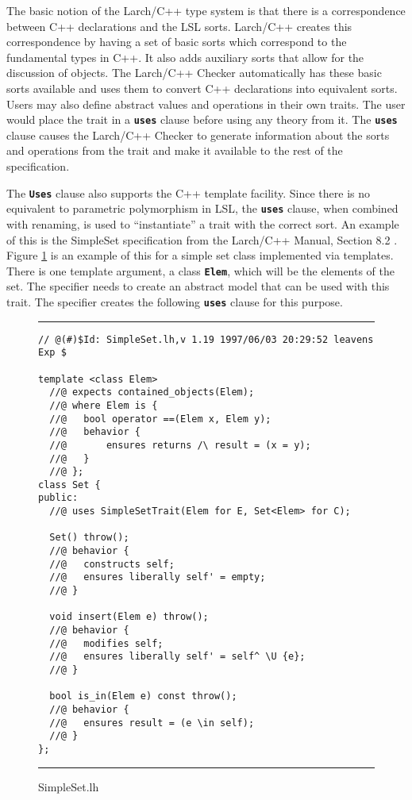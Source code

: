\documentclass[12pt]{article} %
\newcommand{\reserved}[1]{\textbf{\texttt{#1}}} %
\newcommand{\UNSPACEFORBOX}{\vspace{-2ex}}
\newcommand{\HLINE}{\UNSPACEFORBOX%
\begin{flushleft}\rule{\textwidth}{0.01in}\end{flushleft}%
\UNSPACEFORBOX}
\newenvironment{BFIGURE}{

\begin{figure}
\small
\HLINE
}{
\HLINE
\normalsize
\end{figure}
}
\begin{document}
The basic notion of the Larch/C++ type system is that there is a
correspondence between C++ declarations and the LSL sorts. Larch/C++
creates this correspondence by having a set of basic sorts which correspond to
the fundamental types in C++. It also adds auxiliary sorts that allow
for the discussion of objects. The Larch/C++ Checker automatically has
these basic sorts available and uses them to convert C++ declarations
into equivalent sorts. Users may also define abstract values and
operations in their own traits. The user would place the trait in a
\reserved{uses} clause before using any theory from it. The
\reserved{uses} clause causes the Larch/C++ Checker to generate
information about the sorts and operations from the trait and make it
available to the rest of the specification.

The \reserved{Uses} clause also supports the C++ template
facility. Since there is no equivalent to parametric polymorphism in
LSL, the \reserved{uses} clause, when combined with renaming, is used
to ``instantiate'' a trait with the correct sort. An example of this
is the SimpleSet specification from the Larch/C++ Manual, Section 8.2
\cite{Leavens96c}. Figure \ref{simpleset} is an example of this 
for a simple set class implemented via templates. There is one
template argument, a class \reserved{Elem}, which will be the elements
of the set. The specifier needs to create an abstract model that can
be used with this trait. The specifier creates the following
\reserved{uses} clause for this purpose.


\begin{BFIGURE}
\begin{verbatim}
// @(#)$Id: SimpleSet.lh,v 1.19 1997/06/03 20:29:52 leavens Exp $

template <class Elem>
  //@ expects contained_objects(Elem);
  //@ where Elem is {
  //@   bool operator ==(Elem x, Elem y);
  //@   behavior {
  //@       ensures returns /\ result = (x = y);
  //@   }
  //@ };
class Set {
public:
  //@ uses SimpleSetTrait(Elem for E, Set<Elem> for C);

  Set() throw();
  //@ behavior {
  //@   constructs self;
  //@   ensures liberally self' = empty;
  //@ }

  void insert(Elem e) throw();
  //@ behavior {
  //@   modifies self;
  //@   ensures liberally self' = self^ \U {e};
  //@ }

  bool is_in(Elem e) const throw();
  //@ behavior {
  //@   ensures result = (e \in self);
  //@ }
};
\end{verbatim}
\caption{SimpleSet.lh}
\label{simpleset}
\end{BFIGURE}
\end{document}

